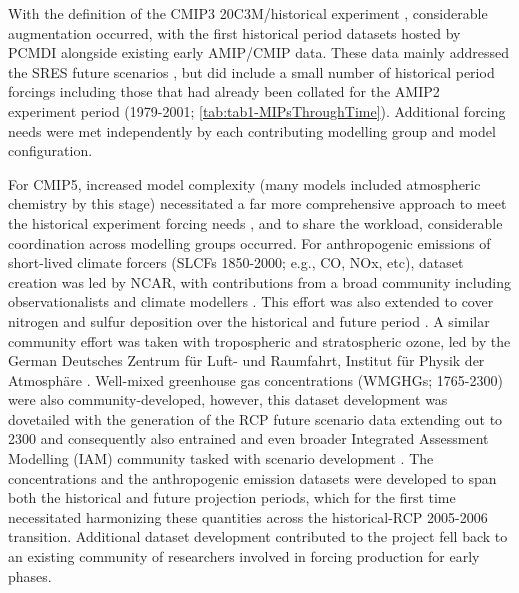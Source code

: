 \documentclass[manuscript]{copernicus}
\begin{document}
With the definition of the CMIP3 20C3M/historical experiment \citep[$\sim$1850-2000;][]{meehl_wcrp_2007}, considerable augmentation occurred, with the first historical period datasets hosted by PCMDI alongside existing early AMIP/CMIP data. These data mainly addressed the SRES future scenarios \citep[2001-2100/2200/2300;][]{nakicenovic_summary_2000}, but did include a small number of historical period forcings including those that had already been collated for the AMIP2 experiment period (1979-2001; \autoref{tab:tab1-MIPsThroughTime}). Additional forcing needs were met independently by each contributing modelling group and model configuration.

For CMIP5, increased model complexity (many models included atmospheric chemistry by this stage) necessitated a far more comprehensive approach to meet the historical experiment forcing needs \citep[1850-2005;][]{taylor_overview_2012}, and to share the workload, considerable coordination across modelling groups occurred. For anthropogenic emissions of short-lived climate forcers (SLCFs 1850-2000; e.g., CO, NOx, etc), dataset creation was led by NCAR, with contributions from a broad community including observationalists and climate modellers \citep{lamarque_historical_2010}. This effort was also extended to cover nitrogen and sulfur deposition over the historical and future period \citep[e.g.,][]{lamarque_multi-model_2013}. A similar community effort was taken with tropospheric and stratospheric ozone, led by the German Deutsches Zentrum f{\"u}r Luft- und Raumfahrt, Institut f{\"u}r Physik der Atmosph{\"a}re \citep[DLR;][]{cionni_ozone_2011}. Well-mixed greenhouse gas concentrations (WMGHGs; 1765-2300) were also community-developed, however, this dataset development was dovetailed with the generation of the RCP future scenario data extending out to 2300 and consequently also entrained and even broader Integrated Assessment Modelling (IAM) community tasked with scenario development \citep{meinshausen_rcp_2011}. The concentrations and the anthropogenic emission datasets were developed to span both the historical and future projection periods, which for the first time necessitated harmonizing these quantities across the historical-RCP 2005-2006 transition. Additional dataset development contributed to the project fell back to an existing community of researchers involved in forcing production for early phases.
\end{document}
